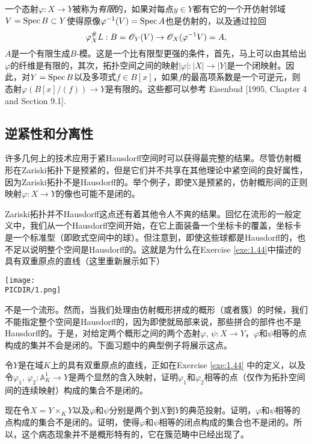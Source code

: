 一个态射$\varphi:X\to Y$被称为\textit{有限}的，如果对每点$y\in Y$都有它的一个开仿射邻域$V=\operatorname{Spec} B\subset Y$使得原像$\varphi^{-1}(V)=\operatorname{Spec} A$也是仿射的，以及通过拉回
\[
	\varphi_X^\#L: B =\mathscr{O}_Y(V)\to \mathscr{O}_X(\varphi^{-1}V)=A,
\]
$A$是一个有限生成$B$-模。这是一个比有限型更强的条件，首先，马上可以由其给出$\varphi$的纤维是有限的，其次，拓扑空间之间的映射$|\varphi|:|X|\to |Y|$是一个闭映射。因此，对$Y=\operatorname{Spec} B$以及多项式$f\in B[x]$，如果$f$的最高项系数是一个可逆元，则态射$\varphi(B[x]/(f))\to Y$是有限的。这些都可以参考 Eisenbud [1995, Chapter 4 and Section 9.1].

\subsection{逆紧性和分离性}\label{s:3.1.2}

许多几何上的技术应用于紧Hausdorff空间时可以获得最完整的结果。尽管仿射概形在Zariski拓扑下是预紧的，但是它们并不共享在其他理论中紧空间的良好属性，因为Zariski拓扑不是Hausdorff的。举个例子，即使X是预紧的，仿射概形间的正则映射$\varphi:X\to Y$的像也可能不是闭的。

Zariski拓扑并不Hausdorff这点还有着其他令人不爽的结果。回忆在流形的一般定义中，我们从一个Hausdorff空间开始，在它上面装备一个坐标卡的覆盖，坐标卡是一个标准型（即欧式空间中的球）。但注意到，即使这些球都是Hausdorff的，也不足以说明整个空间是Hausdorff的。这就是为什么在Exercise \ref{exe:1.44}中描述的具有双重原点的直线（这里重新展示如下）

\begin{center}\texttt{[image: \\PICDIR/1.png]}\end{center}

\vspace{-0.4em}\noindent 不是一个流形。然而，当我们处理由仿射概形拼成的概形（或者簇）的时候，我们不能指定整个空间是Hausdorff的，因为即使就局部来说，那些拼合的部件也不是Hausdorff的。于是，对给定两个概形之间的两个态射$\varphi$, $\psi:X\to Y$，$\varphi$和$\psi$相等的点构成的集并不会是闭的。下面习题中的典型例子将展示这点。

\begin{exe}
\begin{compactenum}[(a)]
\item 令$Y$是在域$K$上的具有双重原点的直线，正如在Exercise \ref{exe:1.44} 中的定义，以及令$\varphi_1$, $\varphi_2:\mathbb{A}_K^1\to Y$是两个显然的含入映射，证明$\varphi_1$和$\varphi_2$相等的点（仅作为拓扑空间间的连续映射）构成的集合不是闭的。
\item 现在令$X=Y\times_K Y$以及$\varphi$和$\psi$分别是两个到$X$到$Y$的典范投射。证明，$\varphi$和$\psi$相等的点构成的集合不是闭的。证明，使得$\varphi$和$\psi$相等的闭点构成的集合也不是闭的。所以，这个病态现象并不是概形特有的，它在簇范畴中已经出现了。
\end{compactenum}
\end{exe}

